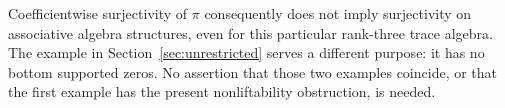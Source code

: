 Coefficientwise surjectivity of $\pi$ consequently does not imply surjectivity on associative algebra structures, even for this particular rank-three trace algebra. The example in Section~\ref{sec:unrestricted} serves a different purpose: it has no bottom supported zeros. No assertion that those two examples coincide, or that the first example has the present nonliftability obstruction, is needed.
